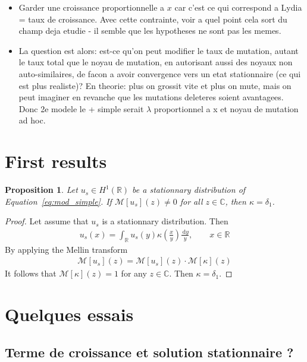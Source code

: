 \documentclass{article}
\newtheorem{proposition}{Proposition}
\newcommand{\diff}{\,\mathrm{d}}
\newcommand{\RR}{\mathbb{R}}
\newcommand{\CC}{\mathbb{C}}
\newcommand{\mellin}{\mathcal{M}}
\begin{document}
\begin{itemize}
    \item Garder une croissance proportionnelle a $x$ car c'est ce qui correspond a Lydia = taux de croissance. Avec cette contrainte, voir a quel point cela sort du champ deja etudie - il semble que les hypotheses ne sont pas les memes.
    \item La question est alors: est-ce qu'on peut modifier le taux de mutation, autant le taux total que le noyau de mutation, en autorisant aussi des noyaux non auto-similaires, de facon a avoir convergence vers un etat stationnaire (ce qui est plus realiste)? En theorie: plus on grossit vite et plus on mute, mais on peut imaginer en revanche que les mutations deleteres soient avantagees. Donc 2e modele le + simple serait $\lambda$ proportionnel a x et noyau de mutation ad hoc.
\end{itemize}

\section{First results}

\begin{proposition}
    Let $u_s \in H^1(\RR)$ be a stationnary distribution of Equation~\ref{eq:mod_simple}. If $\mellin [u_s](z) \neq 0$ for all $z\in\CC$, then $\kappa = \delta_1$.
\end{proposition}
\begin{proof}
    Let assume that $u_s$ is a stationnary distribution. Then 
    \begin{align}
        u_s(x) = \int_\RR u_s(y)\kappa\left(\frac{x}{y}\right) \frac{\diff y}{y}, \qquad x \in \RR
    \end{align}
By applying the Mellin transform 
\begin{align}
    \mellin [u_s](z) = \mellin [u_s](z) \cdot \mellin [\kappa](z)
\end{align}
It follows that $ \mellin [\kappa](z) = 1$ for any $z \in \CC$. 
Then $\kappa = \delta_1$.
\end{proof}


\section{Quelques essais}

\subsection{Terme de croissance et solution stationnaire ?}
\end{document}
